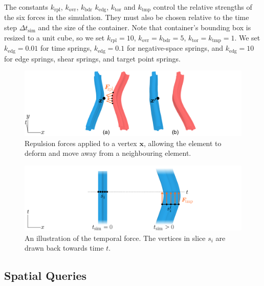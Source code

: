 \newtext
{
The constants $k_\mathrm{rpl}$, $k_\mathrm{ovr}$, $k_\mathrm{bdr}$  $k_\mathrm{edg}$, $k_\mathrm{tor}$ 
and $k_\mathrm{tmp}$ control the relative strengths
of the six forces in the simulation.  They must also be chosen relative to
the time step $\Delta t_\mathrm{sim}$ and the size of the container.
Note that container's bounding box is resized to a unit cube,
so we set $k_\mathrm{rpl}=10$, $k_\mathrm{ovr}=k_\mathrm{bdr}=5$, $k_\mathrm{tor}=k_\mathrm{tmp}=1$.
We set $k_\mathrm{edg} = 0.01$ for time springs,
$k_\mathrm{edg} = 0.1$ for negative-space springs, and $k_\mathrm{edg} = 10$ for edge springs, shear springs,
and target point springs.
}

\begin{figure} 
\centering
\includegraphics[width=1.0\textwidth]{figures/animationpak/repulsion_force.pdf} 
\caption[Repulsion forces applied to a vertex]
{\label{fig_animationpak_repulsion_force} 
Repulsion forces applied to a vertex $\bm{x}$, 
allowing the element to deform and move away from a neighbouring element.}
\end{figure}

\begin{figure}
\centering
\includegraphics[width=1.0\textwidth]{figures/animationpak/t_force.pdf} 
\caption[An illustration of the temporal force]
{\label{fig_animationpak_t_force} 
An illustration of the temporal force.  The vertices in slice
$s_i$ are drawn back towards time $t$.
}
\end{figure}



\subsection{Spatial Queries}
\label{animationpak_spatial_queries}



